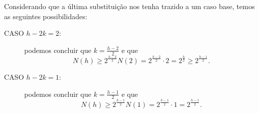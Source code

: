\documentclass[11pt,twoside]{article}
\theoremstyle{definition}
\begin{document}
     Considerando que a última substituição nos tenha trazido a um caso base, temos as seguintes possibilidades:

     \begin{description}
       \item[CASO \( h-2k = 2 \):] podemos concluir que \( k = \frac{h-2}{2} \) e que \[ N(h) \geq 2^{\frac{h-2}{2}} N(2) = 2^{\frac{h-2}{2}} \cdot 2 = 2^{\frac{h}{2}} \geq 2^{\frac{h-1}{2}}. \]
       \item[CASO \( h-2k = 1 \):] podemos concluir que \( k = \frac{h-1}{2} \) e que \[ N(h) \geq 2^{\frac{h-1}{2}} N(1) = 2^{\frac{h-1}{2}} \cdot 1 = 2^{\frac{h-1}{2}}. \]
     \end{description}

     \printbibliography
\end{document}
